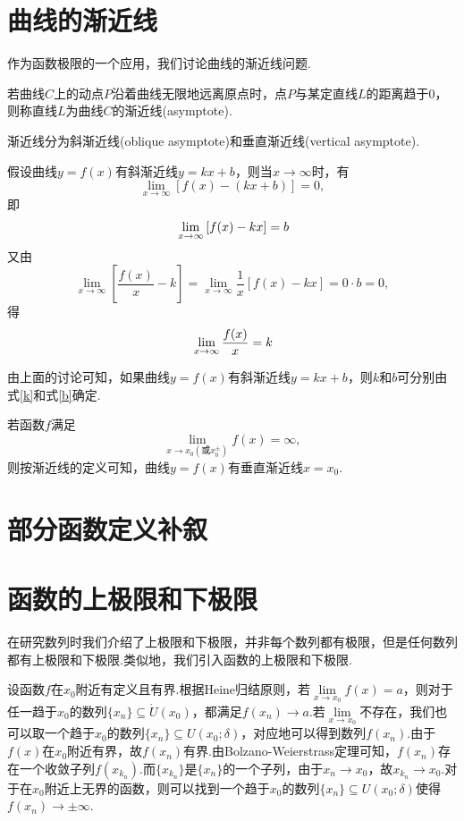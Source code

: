 \section{曲线的渐近线}
作为函数极限的一个应用，我们讨论曲线的渐近线问题.
\begin{definition}[渐近线]
	若曲线$C$上的动点$P$沿着曲线无限地远离原点时，点$P$与某定直线$L$的距离趋于$0$，则称直线$L$为曲线$C$的{\heiti 渐近线}(asymptote).
	
	渐近线分为{\heiti 斜渐近线}(oblique asymptote)和{\heiti 垂直渐近线}(vertical asymptote).
\end{definition}
假设曲线$y=f(x)$有斜渐近线$y=kx+b$，则当$x\to \infty$时，有
$$\lim\limits_{x\to \infty}\left[f(x)-(kx+b)\right]=0,$$
即
\begin{equation}{\label{b}}
	\lim\limits_{x\to \infty}\left[f(x)-kx\right]=b
\end{equation}
又由
$$\lim\limits_{x\to \infty}\left[\frac{f(x)}{x}-k\right]=\lim\limits_{x\to \infty}\frac{1}{x}\left[f(x)-kx\right]=0\cdot b=0,$$
得
\begin{equation}{\label{k}}
	\lim\limits_{x\to \infty}\frac{f(x)}{x}=k
\end{equation}

由上面的讨论可知，如果曲线$y=f(x)$有斜渐近线$y=kx+b$，则$k$和$b$可分别由式\ref{k}和式\ref{b}确定.

若函数$f$满足$$\lim\limits_{x\to x_0(\text{或}x_0^\pm)}f(x)=\infty,$$
则按渐近线的定义可知，曲线$y=f(x)$有垂直渐近线$x=x_0$.
\section{部分函数定义补叙}
\section{函数的上极限和下极限}
在研究数列时我们介绍了上极限和下极限，并非每个数列都有极限，但是任何数列都有上极限和下极限.类似地，我们引入函数的上极限和下极限.

设函数$f$在$x_0$附近有定义且有界.根据Heine归结原则，若$\lim\limits_{x\to x_0}f(x)=a$，则对于任一趋于$x_0$的数列$\{x_n\}\subseteq \mathring{U}(x_0)$，都满足$f(x_n)\to a$.若$\lim\limits_{x\to x_0}$不存在，我们也可以取一个趋于$x_0$的数列$\{x_n\}\subseteq U(x_0;\delta)$，对应地可以得到数列$f(x_n)$.由于$f(x)$在$x_0$附近有界，故$f(x_n)$有界.由Bolzano-Weierstrass定理可知，$f(x_n)$存在一个收敛子列$f(x_{k_n})$.而$\{x_{k_n}\}$是$\{x_n\}$的一个子列，由于$x_n\to x_0$，故$x_{k_n}\to x_0$.对于在$x_0$附近上无界的函数，则可以找到一个趋于$x_0$的数列$\{x_n\}\subseteq U(x_0;\delta)$使得$f(x_n)\to\pm\infty$.

